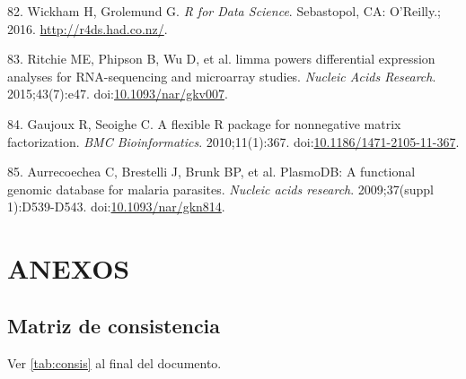 \documentclass[]{article}
\begin{document}
\hypertarget{ref-wickham2016r4ds}{}
82. Wickham H, Grolemund G. \emph{R for Data Science}. Sebastopol, CA:
O'Reilly.; 2016. \url{http://r4ds.had.co.nz/}.

\hypertarget{ref-limma}{}
83. Ritchie ME, Phipson B, Wu D, et al. limma powers differential
expression analyses for RNA-sequencing and microarray studies.
\emph{Nucleic Acids Research}. 2015;43(7):e47.
doi:\href{https://doi.org/10.1093/nar/gkv007}{10.1093/nar/gkv007}.

\hypertarget{ref-Gaujoux2010NMF}{}
84. Gaujoux R, Seoighe C. A flexible R package for nonnegative matrix
factorization. \emph{BMC Bioinformatics}. 2010;11(1):367.
doi:\href{https://doi.org/10.1186/1471-2105-11-367}{10.1186/1471-2105-11-367}.

\hypertarget{ref-plasmodb}{}
85. Aurrecoechea C, Brestelli J, Brunk BP, et al. PlasmoDB: A functional
genomic database for malaria parasites. \emph{Nucleic acids research}.
2009;37(suppl 1):D539-D543.
doi:\href{https://doi.org/10.1093/nar/gkn814}{10.1093/nar/gkn814}.

\section{ANEXOS}\label{anexos}

\subsection{Matriz de consistencia}\label{matriz-de-consistencia}

Ver \autoref{tab:consis} al final del documento.
\end{document}
